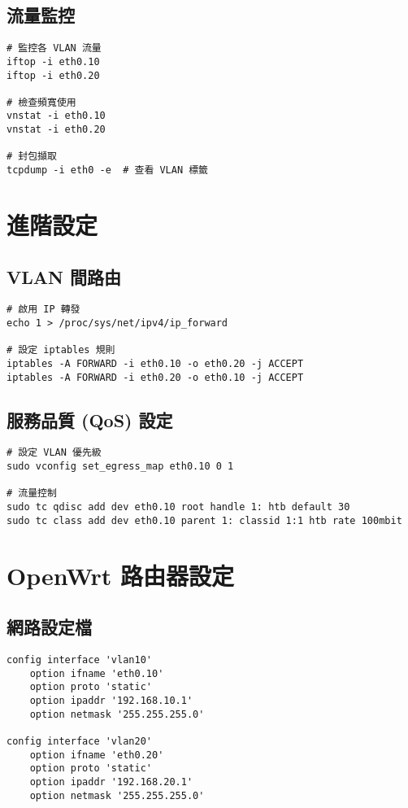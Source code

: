 \documentclass[12pt,a4paper]{article}
\begin{document}
\subsection{流量監控}

\begin{lstlisting}[caption=監控 VLAN 流量]
# 監控各 VLAN 流量
iftop -i eth0.10
iftop -i eth0.20

# 檢查頻寬使用
vnstat -i eth0.10
vnstat -i eth0.20

# 封包擷取
tcpdump -i eth0 -e  # 查看 VLAN 標籤
\end{lstlisting}

\section{進階設定}

\subsection{VLAN 間路由}

\begin{lstlisting}[caption=啟用 VLAN 間路由]
# 啟用 IP 轉發
echo 1 > /proc/sys/net/ipv4/ip_forward

# 設定 iptables 規則
iptables -A FORWARD -i eth0.10 -o eth0.20 -j ACCEPT
iptables -A FORWARD -i eth0.20 -o eth0.10 -j ACCEPT
\end{lstlisting}

\subsection{服務品質 (QoS) 設定}

\begin{lstlisting}[caption=VLAN QoS 設定]
# 設定 VLAN 優先級
sudo vconfig set_egress_map eth0.10 0 1

# 流量控制
sudo tc qdisc add dev eth0.10 root handle 1: htb default 30
sudo tc class add dev eth0.10 parent 1: classid 1:1 htb rate 100mbit
\end{lstlisting}

\section{OpenWrt 路由器設定}

\subsection{網路設定檔}

\begin{lstlisting}[caption=/etc/config/network]
config interface 'vlan10'
    option ifname 'eth0.10'
    option proto 'static'
    option ipaddr '192.168.10.1'
    option netmask '255.255.255.0'

config interface 'vlan20'
    option ifname 'eth0.20'
    option proto 'static'
    option ipaddr '192.168.20.1'
    option netmask '255.255.255.0'
\end{lstlisting}
\end{document}
